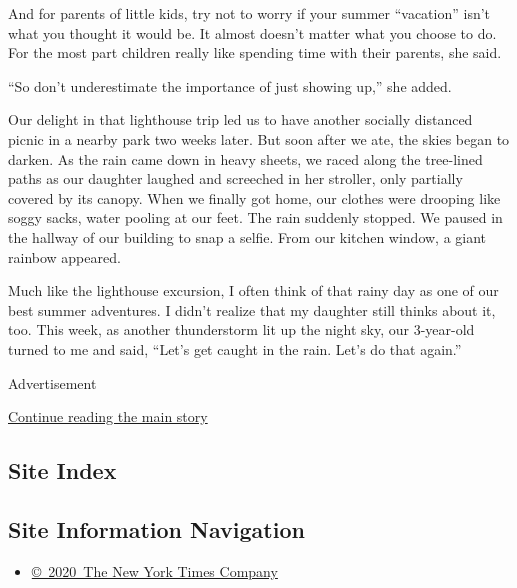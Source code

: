 And for parents of little kids, try not to worry if your summer
``vacation'' isn't what you thought it would be. It almost doesn't
matter what you choose to do. For the most part children really like
spending time with their parents, she said.

``So don't underestimate the importance of just showing up,'' she added.

Our delight in that lighthouse trip led us to have another socially
distanced picnic in a nearby park two weeks later. But soon after we
ate, the skies began to darken. As the rain came down in heavy sheets,
we raced along the tree-lined paths as our daughter laughed and
screeched in her stroller, only partially covered by its canopy. When we
finally got home, our clothes were drooping like soggy sacks, water
pooling at our feet. The rain suddenly stopped. We paused in the hallway
of our building to snap a selfie. From our kitchen window, a giant
rainbow appeared.

Much like the lighthouse excursion, I often think of that rainy day as
one of our best summer adventures. I didn't realize that my daughter
still thinks about it, too. This week, as another thunderstorm lit up
the night sky, our 3-year-old turned to me and said, ``Let's get caught
in the rain. Let's do that again.''

Advertisement

\protect\hyperlink{after-bottom}{Continue reading the main story}

\hypertarget{site-index}{%
\subsection{Site Index}\label{site-index}}

\hypertarget{site-information-navigation}{%
\subsection{Site Information
Navigation}\label{site-information-navigation}}

\begin{itemize}
\tightlist
\item
  \href{https://help.nytimes.com/hc/en-us/articles/115014792127-Copyright-notice}{©~2020~The
  New York Times Company}
\end{itemize}

